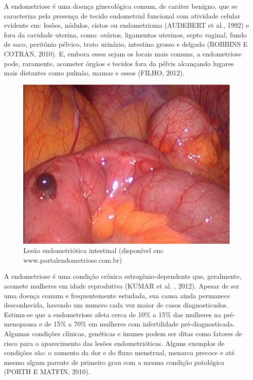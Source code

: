 \documentclass[12pt]{article} %
\begin{document}
A endometriose é uma doença ginecológica comum, de caráter benigno,
que se caracteriza pela presença de tecido endometrial funcional com
atividade celular evidente em: lesões, nódulos, cistos ou
endometrioma (AUDEBERT et al., 1992) e fora da cavidade uterina, como:
ovários, ligamentos uterinos, septo vaginal, fundo de saco, peritônio
pélvico, trato urinário, intestino grosso e delgado (ROBBINS E COTRAN, 2010). E, embora
esses sejam os locais mais comuns, a endometriose pode, raramente,
acometer órgãos e tecidos fora da pélvis alcançando lugares mais distantes 
 como pulmão, mamas e ossos (FILHO,
2012). %

\begin{figure}[h!]
\centering
\includegraphics[width=12cm]{intestinal.png}
\caption[Lesão endometriótica intestinal]{Lesão endometriótica intestinal (disponível em: www.portalendometriose.com.br)}  

\end{figure} 

A endometriose é uma condição crônica estrogênio-dependente que,
geralmente, acomete mulheres em idade reprodutiva (KUMAR et al. ,
2012). Apesar de ser uma doença comum e frequentemente estudada, sua
causa ainda permanece desconhecida, havendo um numero cada vez maior
de casos diagnosticados. Estima-se que a endometriose afeta cerca de 10\% a
15\% das mulheres na pré-menopausa e de 15\% a 70\% em mulheres com
infertilidade pré-diagnosticada. Algumas condições clínicas, genéticas
e imunes podem ser ditas como fatores de risco para o aparecimento das
lesões endometrióticas. Alguns exemplos de condições são: o aumento da
dor e do fluxo menstrual, menarca precoce e até mesmo algum parente de
primeiro grau com a mesma condição patológica (PORTH E MATFIN, 2010).
\end{document}
